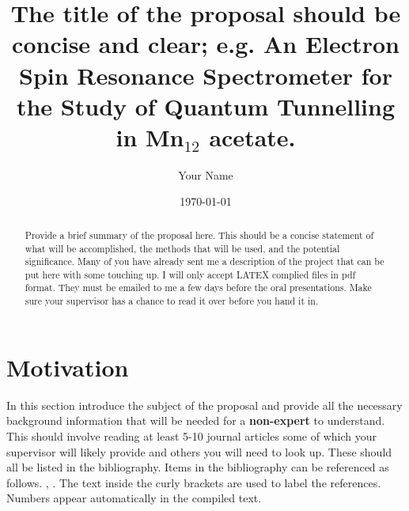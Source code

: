 \documentclass[twocolumn,showpacs,preprintnumbers,amsmath,amssymb]{revtex4}
\begin{document}
\title{The title of the proposal  should be  concise and clear; e.g. An Electron Spin Resonance Spectrometer for the Study of Quantum Tunnelling in  Mn$_{12}$ acetate.}

\author{Your Name}

\date{\today}

\begin{abstract}
Provide a brief summary of the proposal here. This  should be a concise  
statement of what will be accomplished, the methods that will be used, and the potential significance. Many of you have already sent me a description of the project that can be put here with some  touching up. I will only  accept LATEX complied files in pdf format. They must be emailed to me a few days  before the oral presentations.  Make sure your supervisor has a chance to read it over before you hand it in. 

\end{abstract}

\maketitle


\section{Motivation}

In this section introduce the subject of the proposal and  provide all the necessary background information that will be needed for a {\bf non-expert} to understand.  This  should involve reading at least 5-10 journal articles some of which your supervisor will likely provide and others you will need to look up. These should all be listed in the bibliography. 
Items in the bibliography can be referenced  as follows.
\cite{garwin57}, \cite{secondref}. The text inside the curly brackets are
used to label the references. Numbers appear automatically in the compiled
text.
\end{document}
